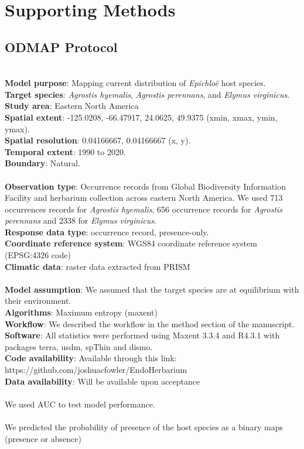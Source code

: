 \documentclass[11pt]{article}
\begin{document}
	\section*{Supporting Methods}
	\subsection*{ODMAP Protocol}\label{sec:sdm}
{\color{blue}{Overview}}\\
\textbf {Model  purpose}: Mapping current distribution of \emph{Epichloë} host species. \\
\textbf {Target species}: \emph{Agrostis hyemalis}, \emph{Agrostis perennans}, and \emph{Elymus virginicus}. \\
\textbf {Study area}: Eastern North America \\
\textbf {Spatial extent}: -125.0208, -66.47917, 24.0625, 49.9375 (xmin, xmax, ymin, ymax).\\
\textbf {Spatial resolution}: 0.04166667, 0.04166667 (x, y).\\
\textbf {Temporal extent}: 1990 to 2020.\\
\textbf {Boundary}: Natural.\\
{\color{blue}{Data}}\\
\textbf {Observation type}: Occurrence records from  Global Biodiversity Information Facility and herbarium collection across eastern North America. We used 713 occurrences records for \emph{Agrostis hyemalis}, 656 occurrence records for \emph{Agrostis perennans} and 2338 for \emph{Elymus virginicus}.\\
\textbf{Response data type}: occurrence record, presence-only.\\
\textbf{Coordinate reference system}: WGS84 coordinate reference system (EPSG:4326 code)\\
\textbf{Climatic data}:  raster data extracted from PRISM  \\
{\color{blue}{Model }}\\
\textbf{Model assumption}: We assumed that the target species are at equilibrium with their environment. \\
\textbf{Algorithms}: Maximum entropy (maxent)\\
\textbf{Workflow}: We  described the workflow in the method section of the manuscript. \\
\textbf{Software}:  All statistics were performed using Maxent 3.3.4 and R4.3.1 with packages terra, usdm, spThin and dismo.\\
\textbf{Code availability}: Available through this link: https://github.com/joshuacfowler/EndoHerbarium \\
\textbf{Data availability}: Will be available upon acceptance \\
{\color{blue}{Assessment}}\\
We used AUC to test model performance.\\
{\color{blue}{Prediction }}\\
We predicted the probability of presence of the host species as a binary maps (presence or absence)
\end{document}
